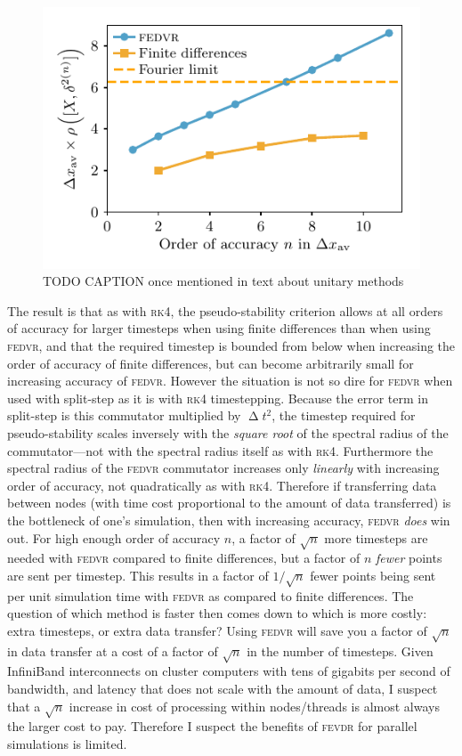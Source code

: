\begin{figure}[t]
    \centerfloat
    \includegraphics{figures/numerics/fedvr_commutation_error_scaling.pdf}
    \caption{TODO CAPTION once mentioned in text about unitary methods}
    \label{fig:fedvr_commutation_error_scaling}
\end{figure}

The result is that as with \textsc{rk4}, the pseudo-stability criterion allows at all orders of accuracy for larger timesteps when using finite differences than when using \textsc{fedvr}, and that the required timestep is bounded from below when increasing the order of accuracy of finite differences, but can become arbitrarily small for increasing accuracy of \textsc{fedvr}. However the situation is not so dire for \textsc{fedvr} when used with split-step as it is with \textsc{rk4} timestepping. Because the error term in split-step is this commutator multiplied by $\upDelta t^2$, the timestep required for pseudo-stability scales inversely with the \emph{square root} of the spectral radius of the commutator---not with the spectral radius itself as with \textsc{rk4}. Furthermore the spectral radius of the \textsc{fedvr} commutator increases only \emph{linearly} with increasing order of accuracy, not quadratically as with \textsc{rk4}. Therefore if transferring data between nodes (with time cost proportional to the amount of data transferred) is the bottleneck of one's simulation, then with increasing accuracy, \textsc{fedvr} \emph{does} win out. For high enough order of accuracy $n$, a factor of $\sqrt{n}$ more timesteps are needed with \textsc{fedvr} compared to finite differences, but a factor of $n$ \emph{fewer} points are sent per timestep. This results in a factor of $1/\sqrt{n}$ fewer points being sent per unit simulation time with \textsc{fedvr} as compared to finite differences. The question of which method is faster then comes down to which is more costly: extra timesteps, or extra data transfer? Using \textsc{fedvr} will save you a factor of $\sqrt{n}$ in data transfer at a cost of a factor of $\sqrt{n}$ in the number of timesteps. Given InfiniBand interconnects on cluster computers with tens of gigabits per second of bandwidth, and latency that does not scale with the amount of data, I suspect that a $\sqrt{n}$ increase in cost of processing within nodes/threads is almost always the larger cost to pay. Therefore I suspect the benefits of \textsc{fevdr} for parallel simulations is limited.

